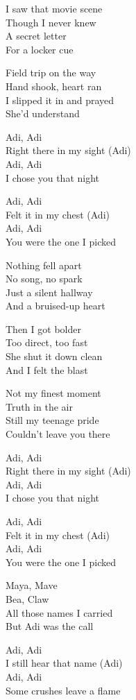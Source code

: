 \begin{lyrics}
I saw that movie scene\\
Though I never knew\\
A secret letter\\
For a locker cue

Field trip on the way\\
Hand shook, heart ran\\
I slipped it in and prayed\\
She’d understand

Adi, Adi\\
Right there in my sight (Adi)\\
Adi, Adi\\
I chose you that night

Adi, Adi\\
Felt it in my chest (Adi)\\
Adi, Adi\\
You were the one I picked

Nothing fell apart\\
No song, no spark\\
Just a silent hallway\\
And a bruised-up heart

Then I got bolder\\
Too direct, too fast\\
She shut it down clean\\
And I felt the blast

Not my finest moment\\
Truth in the air\\
Still my teenage pride\\
Couldn’t leave you there

Adi, Adi\\
Right there in my sight (Adi)\\
Adi, Adi\\
I chose you that night

Adi, Adi\\
Felt it in my chest (Adi)\\
Adi, Adi\\
You were the one I picked

Maya, Mave\\
Bea, Claw\\
All those names I carried\\
But Adi was the call

Adi, Adi\\
I still hear that name (Adi)\\
Adi, Adi\\
Some crushes leave a flame

\end{lyrics}

